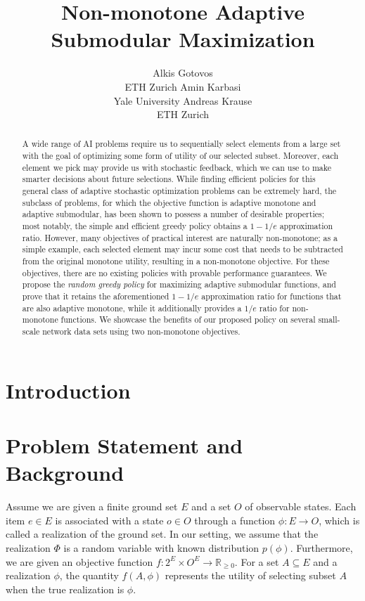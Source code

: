 \documentclass{article}
\title{Non-monotone Adaptive Submodular Maximization}
\author{Alkis Gotovos\\
ETH Zurich
\And
Amin Karbasi\\
Yale University
\And
Andreas Krause\\
ETH Zurich}
\begin{document}
\maketitle

\begin{abstract}
A wide range of AI problems require us to sequentially select elements from a large set with the goal of optimizing some form of utility of our selected subset.
Moreover, each element we pick may provide us with stochastic feedback, which we can use to make smarter decisions about future selections.
While finding efficient policies for this general class of adaptive stochastic optimization problems can be extremely hard, the subclass of problems, for which the objective function is adaptive monotone and adaptive submodular, has been shown to possess a number of desirable properties; most notably, the simple and efficient greedy policy obtains a $1-1/e$ approximation ratio.
However, many objectives of practical interest are naturally non-monotone; as a simple example, each selected element may incur some cost that needs to be subtracted from the original monotone utility, resulting in a non-monotone objective.
For these objectives, there are no existing policies with provable performance guarantees.
We propose the \emph{random greedy policy} for maximizing adaptive submodular functions, and prove that it retains the aforementioned $1-1/e$ approximation ratio for functions that are also adaptive monotone, while it additionally provides a $1/e$ ratio for non-monotone functions.
We showcase the benefits of our proposed policy on several small-scale network data sets using two non-monotone objectives.
\end{abstract}

\section{Introduction}

\clearpage
\section{Problem Statement and Background}
Assume we are given a finite ground set $E$ and a set $O$ of observable states.
Each item $e \in E$ is associated with a state $o \in O$ through a function $\phi : E \to O$, which is called a realization of the ground set.
In our setting, we assume that the realization $\Phi$ is a random variable with known distribution $p(\phi)$.
Furthermore, we are given an objective function $f : 2^E \times O^E \to \mathbb{R}_{\geq 0}$.
For a set $A \subseteq E$ and a realization $\phi$, the quantity $f(A, \phi)$ represents the utility of selecting subset $A$ when the true realization is $\phi$.
\end{document}

